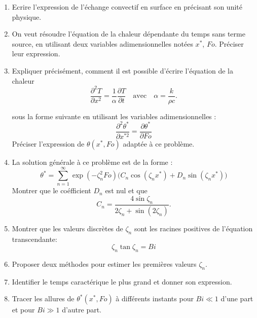 \documentclass[a4paper, 12pt]{article}
\begin{document}
\begin{enumerate}[itemsep=2pt, topsep=2pt, parsep=0pt, partopsep=2pt]
\item Ecrire l'expression de l'échange convectif en surface en précisant son unité physique.
\item On veut résoudre l'équation de la chaleur dépendante du temps sans terme source, en utilisant deux variables adimensionnelles notées $x^*$, $F\!o$. Préciser leur expression.
\item Expliquer précisément, comment il est possible d'écrire l'équation de la chaleur
\begin{equation}
\frac{\partial^2 T}{\partial x^2} = \frac{1}{\alpha} \frac{\partial T}{\partial t} \quad \text{avec} \quad
\alpha = \frac{k}{\rho c}.
\end{equation}

sous la forme suivante en utilisant les variables adimensionnelles :
\begin{equation}
\frac{\partial^2 \theta^*}{\partial x^{*2}} = \frac{\partial \theta^*}{\partial F\!o}
\end{equation}
Préciser l'expression de $\theta(x^*, F\!o)$ adaptée à ce problème.

\item La solution générale à ce problème est de la forme :
\begin{equation}
\theta^* = \sum_{n=1}^{\infty} \exp(-\zeta_n^2 F\!o) \Big( C_n \cos(\zeta_n x^*) +
D_n \sin(\zeta_n x^*)   \Big)
\end{equation}
Montrer que le coéfficient $D_n$ est nul et que 
$$
C_n = \frac{4 \sin \zeta_n}{2\zeta_n + \sin(2\zeta_n)}.
$$

\item Montrer que les valeurs discrètes de $\zeta_n$ sont les racines positives de l'équation transcendante:
\begin{equation}
\zeta_n \tan \zeta_n = Bi
\end{equation}

\item Proposer deux méthodes pour estimer les premières valeurs $\zeta_n$.
\item Identifier le temps caractérique le plus grand et donner son expression.
\item Tracer les allures de $\theta^*(x^*, F\!o)$ à différents instants pour $Bi \ll 1$ d'une part et 
pour $Bi \gg1$ d'autre part.

\end{enumerate}
\end{document}
